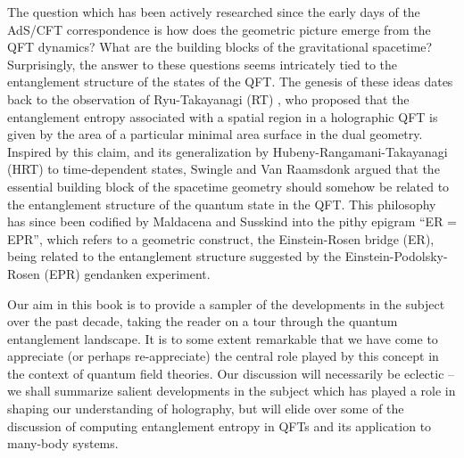 \documentclass[12pt,openany]{book}
\begin{document}
The question which has been actively researched since the early days of the AdS/CFT correspondence is how does the geometric picture emerge from the QFT dynamics? What are the building blocks of the gravitational spacetime?  Surprisingly, the answer to these questions seems intricately tied to the entanglement structure of the states of the QFT. The genesis of these ideas dates back to the observation of Ryu-Takayanagi (RT) \cite{Ryu:2006bv,Ryu:2006ef},  who proposed that the entanglement entropy associated with a spatial region in a holographic QFT is given by the area of a particular minimal area surface in the dual geometry. Inspired by this claim, and its generalization by Hubeny-Rangamani-Takayanagi (HRT) \cite{Hubeny:2007xt} to time-dependent states, Swingle \cite{Swingle:2009bg} and Van Raamsdonk \cite{VanRaamsdonk:2009ar,VanRaamsdonk:2010pw} argued that the essential building block of the spacetime geometry should somehow be related to the entanglement structure of the quantum state in the QFT. This philosophy has since  been codified by Maldacena and Susskind   \cite{Maldacena:2013xja} into the pithy epigram ``ER = EPR'', which refers to a geometric construct, the Einstein-Rosen bridge (ER), being related to the entanglement structure suggested by the Einstein-Podolsky-Rosen  (EPR) gendanken experiment.

Our aim in this book is to provide a sampler of the developments in the subject over the past decade, taking the reader on a tour through the quantum entanglement landscape. It is to some extent remarkable that we have come to appreciate (or perhaps re-appreciate) the central role played by this concept in the context of quantum field theories. Our discussion will necessarily be eclectic -- we shall summarize salient developments in the subject which has played a role in shaping our understanding of holography, but will elide over some of the discussion of computing entanglement entropy in QFTs and its application to many-body systems.
\end{document}

